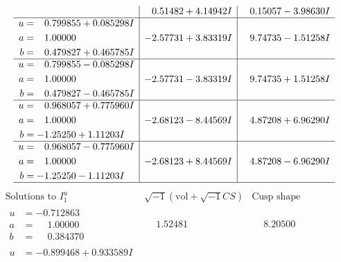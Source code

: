 \documentclass[1p]{elsarticle_modified}
\theoremstyle{definition}
\newcommand{\I}{\sqrt{-1}}
\begin{document}
$$\begin{array}{c|c|c}
 & \phantom{-}0.51482 + 4.14942 I & \phantom{-}0.15057 - 3.98630 I \\ \hline\begin{aligned}
u &= \phantom{-}0.799855 + 0.085298 I \\
a &= \phantom{-}1.00000\phantom{ +0.000000I} \\
b &= \phantom{-}0.479827 + 0.465785 I\end{aligned}
 & -2.57731 + 3.83319 I & \phantom{-}9.74735 - 1.51258 I \\ \hline\begin{aligned}
u &= \phantom{-}0.799855 - 0.085298 I \\
a &= \phantom{-}1.00000\phantom{ +0.000000I} \\
b &= \phantom{-}0.479827 - 0.465785 I\end{aligned}
 & -2.57731 - 3.83319 I & \phantom{-}9.74735 + 1.51258 I \\ \hline\begin{aligned}
u &= \phantom{-}0.968057 + 0.775960 I \\
a &= \phantom{-}1.00000\phantom{ +0.000000I} \\
b &= -1.25250 + 1.11203 I\end{aligned}
 & -2.68123 - 8.44569 I & \phantom{-}4.87208 + 6.96290 I \\ \hline\begin{aligned}
u &= \phantom{-}0.968057 - 0.775960 I \\
a &= \phantom{-}1.00000\phantom{ +0.000000I} \\
b &= -1.25250 - 1.11203 I\end{aligned}
 & -2.68123 + 8.44569 I & \phantom{-}4.87208 - 6.96290 I\\
 \hline 
 \end{array}$$\newpage$$\begin{array}{c|c|c}  
\text{Solutions to }I^u_{1}& \I (\text{vol} + \sqrt{-1}CS) & \text{Cusp shape}\\
 \hline 
\begin{aligned}
u &= -0.712863\phantom{ +0.000000I} \\
a &= \phantom{-}1.00000\phantom{ +0.000000I} \\
b &= \phantom{-}0.384370\phantom{ +0.000000I}\end{aligned}
 & \phantom{-}1.52481\phantom{ +0.000000I} & \phantom{-}8.20500\phantom{ +0.000000I} \\ \hline\begin{aligned}
u &= -0.899468 + 0.933589 I \\

\end{aligned}
\end{array}$$
\end{document}
